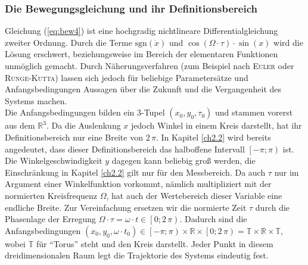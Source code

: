 \documentclass[numbers=noenddot,12pt,a4paper]{scrartcl}
\newcommand{\ix}[1]{_\text{#1}}
\newcommand{\signum}{\text{sgn}}
\begin{document}
\subsubsection{Die Bewegungsgleichung und ihr Definitionsbereich}
Gleichung (\ref{eq:bew4}) ist eine hochgradig nichtlineare Differentialgleichung zweiter Ordnung. Durch die Terme $\signum\left(\dot{x}\right)$ und $\cos\left(\Omega\cdot\tau\right)\cdot\sin\left(x\right)$ wird die Lösung erschwert, beziehungsweise im Bereich der elementaren Funktionen unmöglich gemacht. Durch Näherungsverfahren (zum Beispiel nach \textsc{Euler} oder \textsc{Runge}-\textsc{Kutta}) lassen sich jedoch für beliebige Parametersätze und Anfangsbedingungen Aussagen über die Zukunft und die Vergangenheit des Systems machen.\\
Die Anfangsbedingungen bilden ein 3-Tupel $(x\ix{0},y\ix{0},\tau\ix{0})$ und stammen vorerst aus dem $\mathbb{R}^3$. Da die Auslenkung $x$ jedoch Winkel in einem Kreis darstellt, hat ihr Definitionsbereich nur eine Breite von $2\,\pi$. In Kapitel \ref{ch2.2} wird bereits angedeutet, dass dieser Definitionsbereich das halboffene Intervall $\left[-\pi;\pi\right)$ ist. Die Winkelgeschwindigkeit $y$ dagegen kann beliebig groß werden, die Einschränkung in Kapitel \ref{ch2.2} gilt nur für den Messbereich. Da auch $\tau$ nur im Argument einer Winkelfunktion vorkommt, nämlich multipliziert mit der normierten Kreisfrequenz $\Omega$, hat auch der Wertebereich dieser Variable eine endliche Breite. Zur Vereinfachung ersetzen wir die normierte Zeit $\tau$ durch die Phasenlage der Erregung $\Omega\cdot\tau=\omega\cdot t\in\left[0;2\,\pi\right)$. Dadurch sind die Anfangsbedingungen $(x\ix{0},y\ix{0},\omega\cdot t\ix{0})\in\left[-\pi;\pi\right)\times\mathbb{R}\times\left[0;2\,\pi\right)=\mathbb{T}\times\mathbb{R}\times\mathbb{T}$, wobei $\mathbb{T}$ für "`Torus"' steht und den Kreis darstellt. Jeder Punkt in diesem dreidimensionalen Raum legt die Trajektorie des Systems eindeutig fest.
\end{document}
